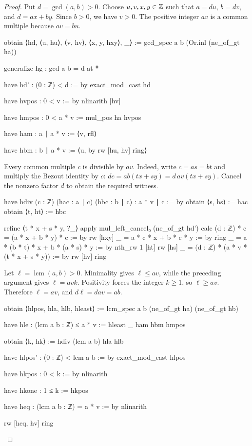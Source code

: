 \begin{proof}

  Put $d=\gcd(a,b)>0$.
  Choose $u,v,x,y\in\mathbb{Z}$ such that $a=du$, $b=dv$, and $d=ax+by$.
  Since $b>0$, we have $v>0$.
  The positive integer $av$ is a common multiple because $av=bu$.

  \begin{lean}
    obtain ⟨hd, ⟨u, hu⟩, ⟨v, hv⟩, ⟨x, y, hxy⟩, _⟩ :=
      gcd_spec a b (Or.inl (ne_of_gt ha))

    generalize hg : gcd a b = d at *

    have hd' : (0 : ℤ) < d := by
      exact_mod_cast hd

    have hvpos : 0 < v := by
      nlinarith [hv]

    have hmpos : 0 < a * v := mul_pos ha hvpos

    have ham : a ∣ a * v := ⟨v, rfl⟩

    have hbm : b ∣ a * v := ⟨u, by
      rw [hu, hv]
      ring⟩
  \end{lean}

  Every common multiple $c$ is divisible by $av$.
  Indeed, write $c=as=bt$ and multiply the Bezout identity by $c$: $dc=ab(tx+sy)=d\,av(tx+sy)$.
  Cancel the nonzero factor $d$ to obtain the required witness.

  \begin{lean}
    have hdiv (c : ℤ) (hac : a ∣ c) (hbc : b ∣ c) : a * v ∣ c := by
      obtain ⟨s, hs⟩ := hac
      obtain ⟨t, ht⟩ := hbc

      refine ⟨t * x + s * y, ?_⟩
      apply mul_left_cancel₀ (ne_of_gt hd')
      calc
        (d : ℤ) * c = (a * x + b * y) * c := by
          rw [hxy]
        _ = a * c * x + b * c * y := by
          ring
        _ = a * (b * t) * x + b * (a * s) * y := by
          nth_rw 1 [ht]
          rw [hs]
        _ = (d : ℤ) * (a * v * (t * x + s * y)) := by
          rw [hv]
          ring
  \end{lean}

  Let $\ell=\operatorname{lcm}(a,b)>0$.
  Minimality gives $\ell\le av$, while the preceding argument gives $\ell=avk$.
  Positivity forces the integer $k\ge1$, so $\ell\ge av$.
  Therefore $\ell=av$, and $d\ell=dav=ab$.

  \begin{lean}
    obtain ⟨hlpos, hla, hlb, hleast⟩ := lcm_spec a b (ne_of_gt ha) (ne_of_gt hb)

    have hle : (lcm a b : ℤ) ≤ a * v := hleast _ ham hbm hmpos

    obtain ⟨k, hk⟩ := hdiv (lcm a b) hla hlb

    have hlpos' : (0 : ℤ) < lcm a b := by
      exact_mod_cast hlpos

    have hkpos : 0 < k := by
      nlinarith

    have hkone : 1 ≤ k := hkpos

    have heq : (lcm a b : ℤ) = a * v := by
      nlinarith

    rw [heq, hv]
    ring
  \end{lean}

\end{proof}
